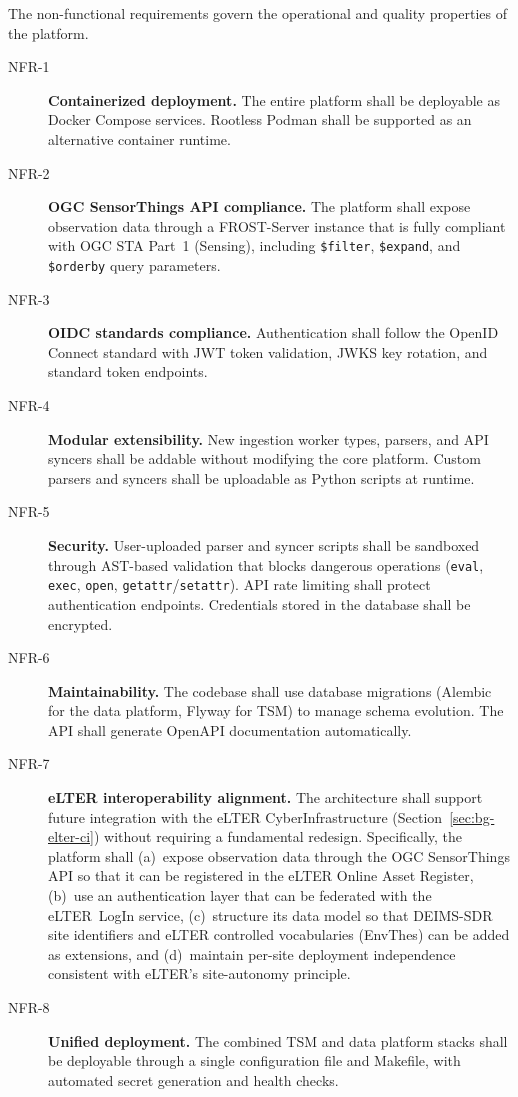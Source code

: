 The non-functional requirements govern the operational and quality properties of the platform.

\begin{description}
  \item[NFR-1] \textbf{Containerized deployment.} The entire platform shall be deployable as
    Docker Compose services. Rootless Podman shall be supported as an alternative container
    runtime.

  \item[NFR-2] \textbf{OGC SensorThings API compliance.} The platform shall expose observation
    data through a FROST-Server instance that is fully compliant with OGC STA Part~1 (Sensing),
    including \texttt{\$filter}, \texttt{\$expand}, and \texttt{\$orderby} query parameters.

  \item[NFR-3] \textbf{OIDC standards compliance.} Authentication shall follow the OpenID Connect
    standard with JWT token validation, JWKS key rotation, and standard token endpoints.

  \item[NFR-4] \textbf{Modular extensibility.} New ingestion worker types, parsers, and API
    syncers shall be addable without modifying the core platform. Custom parsers and syncers shall
    be uploadable as Python scripts at runtime.

  \item[NFR-5] \textbf{Security.} User-uploaded parser and syncer scripts shall be sandboxed
    through AST-based validation that blocks dangerous operations (\texttt{eval}, \texttt{exec},
    \texttt{open}, \texttt{getattr}/\texttt{setattr}). API rate limiting shall protect
    authentication endpoints. Credentials stored in the database shall be encrypted.

  \item[NFR-6] \textbf{Maintainability.} The codebase shall use database migrations (Alembic
    for the data platform, Flyway for TSM) to manage schema evolution. The API shall generate
    OpenAPI documentation automatically.

  \item[NFR-7] \textbf{eLTER interoperability alignment.} The architecture shall support
    future integration with the eLTER CyberInfrastructure
    (Section~\ref{sec:bg-elter-ci}) without requiring a fundamental redesign. Specifically,
    the platform shall (a)~expose observation data through the OGC SensorThings API so that
    it can be registered in the eLTER Online Asset Register, (b)~use an authentication layer
    that can be federated with the eLTER~LogIn service, (c)~structure its data model so that
    DEIMS-SDR site identifiers and eLTER controlled vocabularies (EnvThes) can be added as
    extensions, and (d)~maintain per-site deployment independence consistent with eLTER's
    site-autonomy principle.

  \item[NFR-8] \textbf{Unified deployment.} The combined TSM and data platform stacks shall
    be deployable through a single configuration file and Makefile, with automated secret
    generation and health checks.
\end{description}

